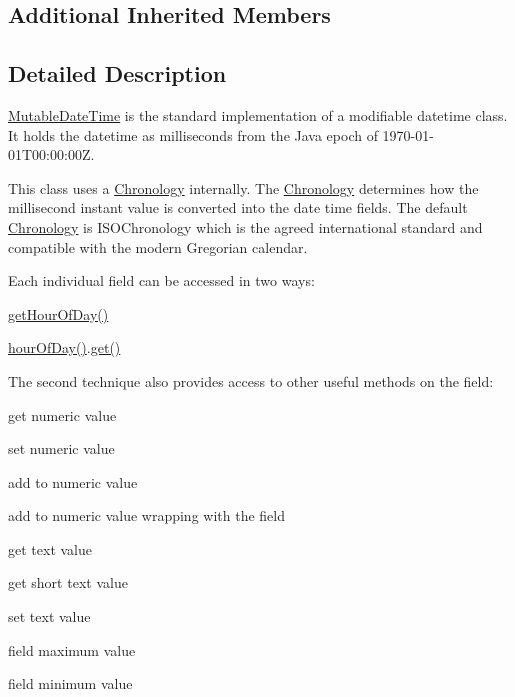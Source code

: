 \subsection*{Additional Inherited Members}


\subsection{Detailed Description}
\hyperlink{classorg_1_1joda_1_1time_1_1_mutable_date_time}{Mutable\-Date\-Time} is the standard implementation of a modifiable datetime class. It holds the datetime as milliseconds from the Java epoch of 1970-\/01-\/01\-T00\-:00\-:00\-Z. 

This class uses a \hyperlink{classorg_1_1joda_1_1time_1_1_chronology}{Chronology} internally. The \hyperlink{classorg_1_1joda_1_1time_1_1_chronology}{Chronology} determines how the millisecond instant value is converted into the date time fields. The default \hyperlink{classorg_1_1joda_1_1time_1_1_chronology}{Chronology} is {\ttfamily I\-S\-O\-Chronology} which is the agreed international standard and compatible with the modern Gregorian calendar. 

Each individual field can be accessed in two ways\-: 
\begin{DoxyItemize}
\item {\ttfamily \hyperlink{classorg_1_1joda_1_1time_1_1base_1_1_abstract_date_time_a62ed23997a651926bf71fb42c5e32457}{get\-Hour\-Of\-Day()}} 
\item {\ttfamily \hyperlink{classorg_1_1joda_1_1time_1_1_mutable_date_time_a3bfaaca097843a8d526d12c03e1b53e2}{hour\-Of\-Day()}.\hyperlink{classorg_1_1joda_1_1time_1_1base_1_1_abstract_date_time_af30504cd429178fe15ecf1df8684cc85}{get()}} 
\end{DoxyItemize}The second technique also provides access to other useful methods on the field\-: 
\begin{DoxyItemize}
\item get numeric value 
\item set numeric value 
\item add to numeric value 
\item add to numeric value wrapping with the field 
\item get text value 
\item get short text value 
\item set text value 
\item field maximum value 
\item field minimum value 
\end{DoxyItemize}

